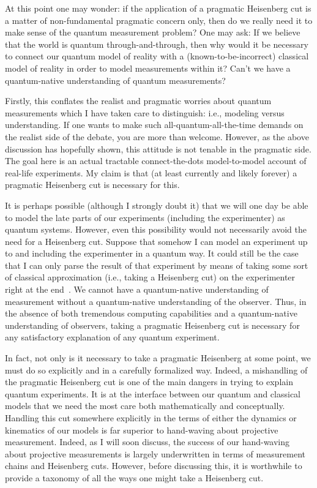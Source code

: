 \documentclass[prd,twocolumn,superscriptaddress,floatfix,amsmath,amssymb,amsfonts,nofootinbib]{revtex4-2}
\begin{document}
At this point one may wonder: if the application of a pragmatic Heisenberg cut is a matter of non-fundamental pragmatic concern only, then do we really need it to make sense of the quantum measurement problem? One may ask: If we believe that the world is quantum through-and-through, then why would it be necessary to connect our quantum model of reality with a (known-to-be-incorrect) classical model of reality in order to model measurements within it? Can't we have a quantum-native understanding of quantum measurements?

Firstly, this conflates the realist and pragmatic worries about quantum measurements which I have taken care to distinguish: i.e., modeling versus understanding. If one wants to make such all-quantum-all-the-time demands on the realist side of the debate, you are more than welcome. However, as the above discussion has hopefully shown, this attitude is not tenable in the pragmatic side. The goal here is an actual tractable connect-the-dots model-to-model account of real-life experiments. My claim is that (at least currently and likely forever) a pragmatic Heisenberg cut is necessary for this. 

It is perhaps possible (although I strongly doubt it) that we will one day be able to model the late parts of our experiments (including the experimenter) as quantum systems. However, even this possibility would not necessarily avoid the need for a Heisenberg cut. Suppose that somehow I can model an experiment up to and including the experimenter in a quantum way. It could still be the case that I can only parse the result of that experiment by means of taking some sort of classical approximation (i.e., taking a Heisenberg cut) on the experimenter right at the end~\cite{WallaceEmergentMultiverse}. We cannot have a quantum-native understanding of measurement without a quantum-native understanding of the observer. Thus, in the absence of both tremendous computing capabilities and a quantum-native understanding of observers, taking a pragmatic Heisenberg cut is necessary for any satisfactory explanation of any quantum experiment.

In fact, not only is it necessary to take a pragmatic Heisenberg at some point, we must do so explicitly and in a carefully formalized way. Indeed, a mishandling of the pragmatic Heisenberg cut is one of the main dangers in trying to explain quantum experiments. It is at the interface between our quantum and classical models that we need the most care both mathematically and conceptually. Handling this cut somewhere explicitly in the terms of either the dynamics or kinematics of our models is far superior to hand-waving about projective measurement. Indeed, as I will soon discuss, the success of our hand-waving about projective measurements is largely underwritten in terms of measurement chains and Heisenberg cuts. However, before discussing this, it is worthwhile to provide a taxonomy of all the ways one might take a Heisenberg cut.
\end{document}
